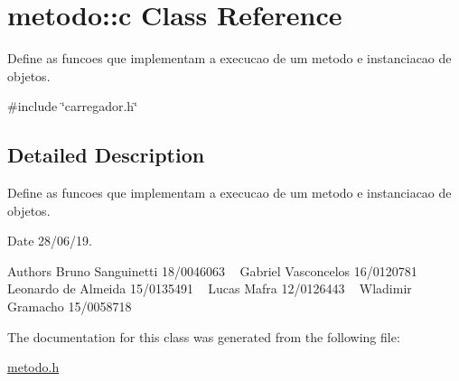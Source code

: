 \hypertarget{classmetodo_1_1c}{}\section{metodo\+:\+:c Class Reference}
\label{classmetodo_1_1c}


Define as funcoes que implementam a execucao de um metodo e instanciacao de objetos.  




{\ttfamily \#include \char`\"{}carregador.\+h\char`\"{}}



\subsection{Detailed Description}
Define as funcoes que implementam a execucao de um metodo e instanciacao de objetos. 

\begin{DoxyDate}{Date}
28/06/19.
\end{DoxyDate}
\begin{DoxyAuthor}{Authors}
Bruno Sanguinetti 18/0046063 ~\newline
Gabriel Vasconcelos 16/0120781 ~\newline
Leonardo de Almeida 15/0135491 ~\newline
Lucas Mafra 12/0126443 ~\newline
Wladimir Gramacho 15/0058718 ~\newline

\end{DoxyAuthor}


The documentation for this class was generated from the following file\+:\begin{DoxyCompactItemize}
\item 
\hyperlink{metodo_8h}{metodo.\+h}\end{DoxyCompactItemize}
